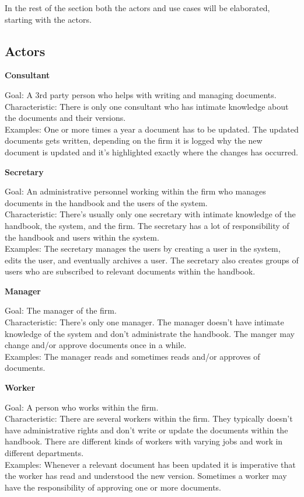 In the rest of the section both the actors and use cases will be elaborated, starting with the actors.

\subsection{Actors}

\textbf{Consultant}

Goal: A 3rd party person who helps with writing and managing documents.
\\
Characteristic: There is only one consultant who has intimate knowledge about the documents and their versions.
\\
Examples: One or more times a year a document has to be updated. The updated documents gets written, depending on the firm it is logged why the new document is updated and it’s highlighted exactly where the changes has occurred.

\textbf{Secretary}

Goal: An administrative personnel working within the firm who manages documents in the handbook and the users of the system.
\\
Characteristic: There’s usually only one secretary with intimate knowledge of the handbook, the system, and the firm. The secretary has a lot of responsibility of the handbook and users within the system.
\\
Examples: The secretary manages the users by creating a user in the system, edits the user, and eventually archives a user.
The secretary also creates groups of users who are subscribed to relevant documents within the handbook.

\textbf{Manager}

Goal: The manager of the firm.
\\
Characteristic: There’s only one manager. The manager doesn’t have intimate knowledge of the system and don’t administrate the handbook.
The manger may change and/or approve documents once in a while.
\\
Examples: The manager reads and sometimes reads and/or approves of documents.

\textbf{Worker}

Goal: A person who works within the firm.
\\
Characteristic: There are several workers within the firm. They typically doesn’t have administrative rights and don’t write or update the documents within the handbook. There are different kinds of workers with varying jobs and work in different departments.
\\
Examples: Whenever a relevant document has been updated it is imperative that the worker has read and understood the new version.
Sometimes a worker may have the responsibility of approving one or more documents.

